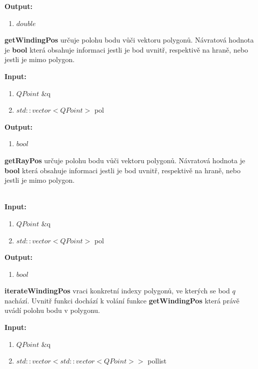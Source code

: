 \documentclass{article}
\begin{document}
\bigskip 
\textbf{Output:}
\begin{enumerate} 
\item $double$
\end{enumerate}

\bigskip 
\textbf{getWindingPos} určuje polohu bodu vůči vektoru polygonů. Návratová hodnota je  \textbf{bool} která obsahuje informaci jestli je bod uvnitř, respektivě na hraně, nebo jestli je mimo polygon.\\ 

\bigskip 


\textbf{Input:}
\begin{enumerate} 
\item $QPoint$ \&q
\item $std::vector<QPoint>$ pol
\end{enumerate}

\bigskip 
\textbf{Output:}
\begin{enumerate} 
\item $bool$
\end{enumerate}

\bigskip 

\textbf{getRayPos} určuje polohu bodu vůči vektoru polygonů. Návratová hodnota je \textbf{bool} která obsahuje informaci jestli je bod uvnitř, respektivě na hraně, nebo jestli je mimo polygon.\\ \\ 

\bigskip 

 \textbf{Input:}
\begin{enumerate} 
\item $QPoint$ \&q
\item $std::vector<QPoint>$ pol
\end{enumerate}

\bigskip 
\textbf{Output:}
\begin{enumerate} 
\item $bool$
\end{enumerate}



\bigskip 

\textbf{iterateWindingPos} vraci konkretní indexy polygonů, ve kterých se bod $q$ nachází. Uvnitř funkci dochází k volání funkce \textbf{getWindingPos} která právě uvádí polohu bodu v polygonu.
 \\ 

\bigskip 

 \textbf{Input:}
\begin{enumerate} 
\item $QPoint$ \&q
\item $std::vector<std::vector<QPoint>> $ pollist
\end{enumerate}
\end{document}
